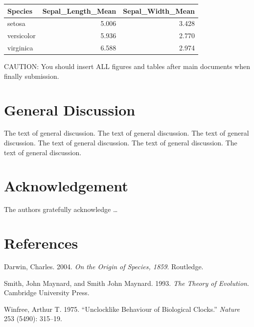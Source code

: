 \documentclass[12pt, a4paper]{report} %
\newlength{\cslhangindent}
\newenvironment{CSLReferences}[2] %
 {%
  \setlength{\parindent}{0pt}
  \ifodd #1 \everypar{\setlength{\hangindent}{\cslhangindent}}\ignorespaces\fi
  \ifnum #2 > 0
  \setlength{\parskip}{#2\baselineskip}
  \fi
 }%
 {}
\begin{document}
\newpage

\begin{longtable}[]{@{}lrr@{}}
\toprule
Species & Sepal\_Length\_Mean & Sepal\_Width\_Mean \\
\midrule
\endhead
setosa & 5.006 & 3.428 \\
versicolor & 5.936 & 2.770 \\
virginica & 6.588 & 2.974 \\
\bottomrule
\end{longtable}

CAUTION: You should insert ALL figures and tables after main documents
when finally submission.

\chapter*{General Discussion}
\parindent=5.3mm

The text of general discussion. The text of general discussion. The text
of general discussion. The text of general discussion. The text of
general discussion. The text of general discussion.

\chapter*{Acknowledgement}

The authors gratefully acknowledge \ldots{}

\chapter*{References}

\hypertarget{refs}{}
\begin{CSLReferences}{1}{0}
\leavevmode{}%
Darwin, Charles. 2004. \emph{On the Origin of Species, 1859}. Routledge.

\leavevmode{}%
Smith, John Maynard, and Smith John Maynard. 1993. \emph{The Theory of
Evolution}. Cambridge University Press.

\leavevmode{}%
Winfree, Arthur T. 1975. {``Unclocklike Behaviour of Biological
Clocks.''} \emph{Nature} 253 (5490): 315--19.

\end{CSLReferences}



\end{document}
